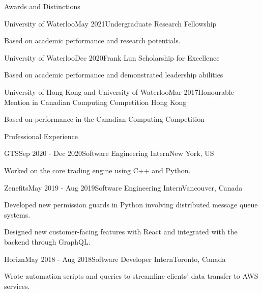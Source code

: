 \documentclass{cv}
\begin{document}
\begin{rSection}{Awards and Distinctions}
\begin{rSubsection}{University of Waterloo}{May 2021}{Undergraduate Research Fellowship}{}
	\item Based on academic performance and research potentials.
\end{rSubsection}

\begin{rSubsection}{University of Waterloo}{Dec 2020}{Frank Lun Scholarship for Excellence}{}
	\item Based on academic performance and demonstrated leadership abilities
\end{rSubsection}



\begin{rSubsection}{University of Hong Kong and University of Waterloo}{Mar 2017}{Honourable Mention in Canadian Computing Competition Hong Kong}{}
	\item Based on performance in the Canadian Computing Competition 
\end{rSubsection}
\end{rSection}


\begin{rSection}{Professional Experience}
\begin{rSubsection}{GTS}{Sep 2020 - Dec 2020}{Software Engineering Intern}{New York, US}
	\item Worked on the core trading engine using C++ and Python.
\end{rSubsection}

\begin{rSubsection}{Zenefits}{May 2019 - Aug 2019}{Software Engineering Intern}{Vancouver, Canada}
	\item Developed new permission guards in Python involving distributed message queue systems.
	\item Designed new customer-facing features with React and integrated with the backend through GraphQL.
\end{rSubsection}

\begin{rSubsection}{Horizn}{May 2018 - Aug 2018}{Software Developer Intern}{Toronto, Canada}
	\item Wrote automation scripts and queries to streamline clients’ data transfer to AWS services. 
\end{rSubsection}
\end{rSection}
\end{document}
